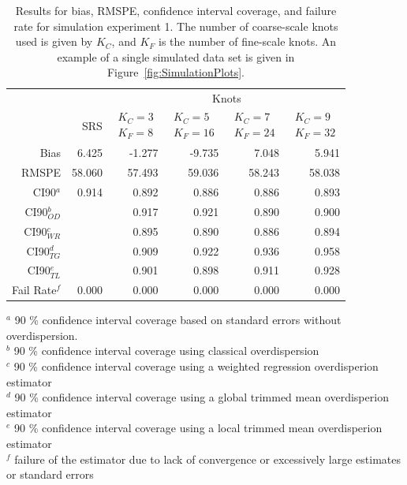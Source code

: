 \documentclass[12pt, titlepage]{article}\usepackage[]{graphicx}\usepackage[]{color}
\begin{document}
\footnotesize
\begin{table}[ht]
\caption{Results for bias, RMSPE, confidence interval coverage, and failure rate for simulation experiment 1. The number of coarse-scale knots used is given by $K_C$, and $K_F$ is the number of fine-scale knots. An example of a single simulated data set is given in Figure~\ref{fig:SimulationPlots}. \label{Tab:Sim1}}
\begin{center}
\begin{tabular}{rrrrrr}
  \hline
  \hline
	&  & \multicolumn{4}{c}{Knots} \\ 
 & SRS & $\begin{array}{c}K_C=3  \\ K_F=8 \end{array}$ & $\begin{array}{c}K_C=5  \\ K_F=16 \end{array}$ & $\begin{array}{c}K_C=7  \\ K_F=24 \end{array}$ & $\begin{array}{c}K_C=9  \\ K_F=32 \end{array}$ \\
  \hline
 Bias & 6.425 & -1.277 & -9.735 & 7.048 & 5.941 \\ 
  RMSPE & 58.060 & 57.493 & 59.036 & 58.243 & 58.038 \\ 
  CI90$^a$ & 0.914 & 0.892 & 0.886 & 0.886 & 0.893 \\ 
  CI90$_{OD}^b$ &  & 0.917 & 0.921 & 0.890 & 0.900 \\ 
  CI90$_{WR}^c$ &  & 0.895 & 0.890 & 0.886 & 0.894 \\ 
  CI90$_{TG}^d$ &  & 0.909 & 0.922 & 0.936 & 0.958 \\ 
  CI90$_{TL}^e$ &  & 0.901 & 0.898 & 0.911 & 0.928 \\ 
  Fail Rate$^f$ & 0.000 & 0.000 & 0.000 & 0.000 & 0.000 \\ 
  

   \hline
\end{tabular}
\end{center}
\textrm{$^a$ 90 \% confidence interval coverage based on standard errors without overdispersion.} \\ 
\textrm{$^b$ 90 \% confidence interval coverage using classical overdispersion} \\
\textrm{$^c$ 90 \% confidence interval coverage using a weighted regression overdisperion estimator} \\
\textrm{$^d$ 90 \% confidence interval coverage using a global trimmed mean overdisperion estimator} \\
\textrm{$^e$ 90 \% confidence interval coverage using a local trimmed mean overdisperion estimator} \\
\textrm{$^f$ failure of the estimator due to lack of convergence or excessively large estimates or standard errors} \\
\end{table}
\end{document}
